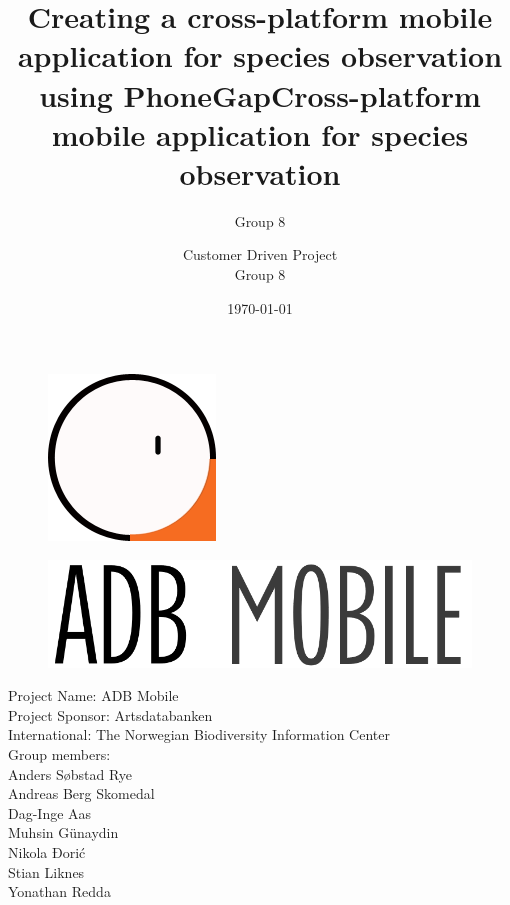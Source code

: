 \documentclass[a4paper]{article}
\begin{document}
  \title{Creating a cross-platform mobile application for species observation using PhoneGap}

  \title{Cross-platform mobile application  for species observation}



	\author{Group 8}

\begin{figure}
    \centering
    \includegraphics[scale=0.5]{Logo_.png}
  \end{figure}


  \begin{figure}
    \centering
    \includegraphics[scale=0.5]{ADB_Mobile_Logo.png}
  \end{figure}
	\author{Customer Driven Project \\ Group 8}
	\date{\today}
	\maketitle
	\thispagestyle{empty}
	\pagebreak

	\pagestyle{empty}
	\begin{center}
		Project Name: ADB Mobile \\
		Project Sponsor: Artsdatabanken \\
		International: The Norwegian Biodiversity Information Center \\
    Group members: \\
    Anders Søbstad Rye\\
    Andreas Berg Skomedal\\
    Dag-Inge Aas\\
    Muhsin Günaydin\\
    Nikola Đorić\\
    Stian Liknes\\
    Yonathan Redda
	\end{center}
	\newpage
\end{document}
